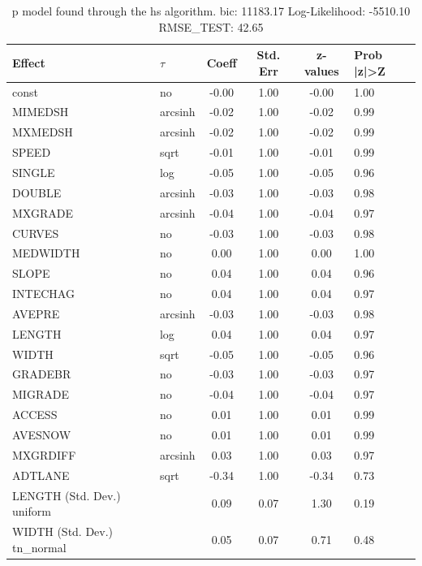 \begin{table}
	\caption{p model found through the hs algorithm. bic: 11183.17 Log-Likelihood: -5510.10 RMSE_TEST: 42.65}
	\begin{center}
		\begin{tabular}{|l|l|c|c|c|l|}
			\hline
			Effect & $\tau$ & Coeff & Std. Err & z-values & Prob |z|>Z \\
			\hline
			const & no & -0.00 & 1.00 & -0.00 & 1.00 \\
			\hline
			MIMEDSH & arcsinh & -0.02 & 1.00 & -0.02 & 0.99 \\
			\hline
			MXMEDSH & arcsinh & -0.02 & 1.00 & -0.02 & 0.99 \\
			\hline
			SPEED & sqrt & -0.01 & 1.00 & -0.01 & 0.99 \\
			\hline
			SINGLE & log & -0.05 & 1.00 & -0.05 & 0.96 \\
			\hline
			DOUBLE & arcsinh & -0.03 & 1.00 & -0.03 & 0.98 \\
			\hline
			MXGRADE & arcsinh & -0.04 & 1.00 & -0.04 & 0.97 \\
			\hline
			CURVES & no & -0.03 & 1.00 & -0.03 & 0.98 \\
			\hline
			MEDWIDTH & no & 0.00 & 1.00 & 0.00 & 1.00 \\
			\hline
			SLOPE & no & 0.04 & 1.00 & 0.04 & 0.96 \\
			\hline
			INTECHAG & no & 0.04 & 1.00 & 0.04 & 0.97 \\
			\hline
			AVEPRE & arcsinh & -0.03 & 1.00 & -0.03 & 0.98 \\
			\hline
			LENGTH & log & 0.04 & 1.00 & 0.04 & 0.97 \\
			\hline
			WIDTH & sqrt & -0.05 & 1.00 & -0.05 & 0.96 \\
			\hline
			GRADEBR & no & -0.03 & 1.00 & -0.03 & 0.97 \\
			\hline
			MIGRADE & no & -0.04 & 1.00 & -0.04 & 0.97 \\
			\hline
			ACCESS & no & 0.01 & 1.00 & 0.01 & 0.99 \\
			\hline
			AVESNOW & no & 0.01 & 1.00 & 0.01 & 0.99 \\
			\hline
			MXGRDIFF & arcsinh & 0.03 & 1.00 & 0.03 & 0.97 \\
			\hline
			ADTLANE & sqrt & -0.34 & 1.00 & -0.34 & 0.73 \\
			\hline
			LENGTH (Std. Dev.) uniform &  & 0.09 & 0.07 & 1.30 & 0.19 \\
			\hline
			WIDTH (Std. Dev.) tn_normal &  & 0.05 & 0.07 & 0.71 & 0.48 \\

\end{tabular}
\end{center}
\end{table}
